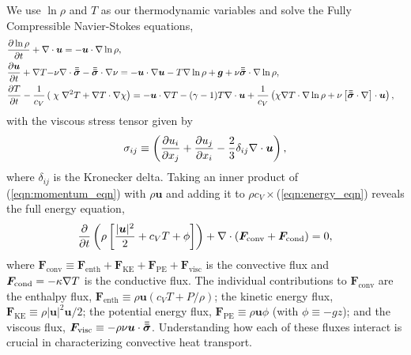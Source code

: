We use $\ln \rho$ and $T$ as our thermodynamic variables and solve the Fully Compressible Navier-Stokes equations,
\begin{align}
&\begin{aligned}
&\frac{\partial \ln\rho}{\partial t} + \nabla\cdot\bm{u} 
    = -\bm{u}\cdot\nabla\ln\rho,
	\label{eqn:continuity_eqn}
\end{aligned}\\
&\begin{aligned}
\frac{\partial\bm{u}}{\partial t} + \nabla T - 
&\nu\nabla\cdot\bm{\bar{\bar{\sigma}}} - \bm{\bar{\bar{\sigma}}}\cdot\nabla\nu =
-\bm{u}\cdot\nabla\bm{u} - T\nabla\ln\rho + \bm{g} + 
\nu\bm{\bar{\bar{\sigma}}}\cdot\nabla\ln\rho,
\label{eqn:momentum_eqn}
\end{aligned}\\
&\begin{aligned}
\frac{\partial T}{\partial t} -\frac{1}{c_V}\left(\right.\chi&\left.
    \nabla^2 T + \nabla T\cdot\nabla\chi\right) =
	-\bm{u}\cdot\nabla T - (\gamma-1)T\nabla\cdot{\bm{u}}
	+ \frac{1}{c_V}\left(\chi\nabla T \cdot\nabla\ln\rho +
	\nu\left[\bm{\bar{\bar{\sigma}}}\cdot\nabla\right]\cdot\bm{u}\right), 
	\label{eqn:energy_eqn}
\end{aligned}
\end{align}
with the viscous stress tensor given by
\begin{equation}
\sigma_{ij} \equiv \left(\frac{\partial u_i}{\partial x_j} + 
\frac{\partial u_j}{\partial x_i} - \frac{2}{3}\delta_{ij}\nabla\cdot\bm{u}\right),
	\label{eqn:stress_tensor}
\end{equation}
where $\delta_{ij}$ is the Kronecker delta. 
Taking an inner product of (\ref{eqn:momentum_eqn}) with $\rho\bm{u}$ and adding it to $\rho c_V\times$(\ref{eqn:energy_eqn}) reveals the full energy equation,
\begin{equation}
\frac{\partial}{\partial t}\left(\rho\left[\frac{|\bm{u}|^2}{2} + c_V T + \phi\right]\right) +
\nabla\cdot\left( \bm{F}_{\text{conv}} + \bm{F}_{\text{cond}}\right) = 0,
	\label{eqn:energy_eqn_full}
\end{equation}
where
$
\bm{F}_{\text{conv}} \equiv \bm{F}_{\text{enth}} + \bm{F}_{\text{KE}} + \bm{F}_{\text{PE}} + \bm{F}_{\text{visc}}
$
is the convective flux and $\bm{F}_{\text{cond}} = -\kappa \nabla T$ is the conductive flux.
The individual contributions to $\bm{F}_{\text{conv}}$ are the enthalpy flux, $\bm{F}_{\text{enth}} \equiv \rho\bm{u}(c_V T + P/\rho)$; the kinetic energy flux, $\bm{F}_{\text{KE}} \equiv \rho|\bm{u}|^2\bm{u}/2$; the potential energy flux, $\bm{F}_{\text{PE}} \equiv \rho\bm{u}\phi$ (with $\phi \equiv -gz$); and the viscous flux, $\bm{F}_{\text{visc}} \equiv -\rho\nu\bm{u}\cdot\bm{\bar{\bar{\sigma}}}$.
Understanding how each of these fluxes interact is crucial in characterizing convective heat transport.

